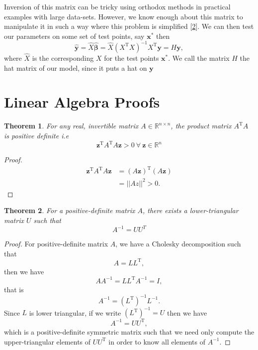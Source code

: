 \documentclass[10pt,a4paper, twocolumn, conference]{IEEEtran}
\theoremstyle{own}
\theoremstyle{definition}
\theoremstyle{plain}
\newtheorem{thm}{Theorem}
\begin{document}
Inversion of this matrix can be tricky using orthodox methods in practical examples with large data-sets. However, we know enough about this matrix to manipulate it in such a way where this problem is simplified [\ref{ap:2}]. We can then test our parameters on some set of test points, say $\mathbf{x}^{*}$ then
\begin{equation}
\hat{\mathbf{y}} = \hat{X} \hat{\boldsymbol\beta} = \hat{X} (X^{\text{T}} X)^{-1} X^{\text{T}}\mathbf{y} = H\textbf{y},
\end{equation}
where $\hat{X}$ is the corresponding $X$ for the test points $\mathbf{x}^{*}$. We call the matrix $H$ the hat matrix of our model, since it puts a hat on $\mathbf{y}$


\appendix
\section{Linear Algebra Proofs}
\begin{thm} \label{posdef}
For any real, invertible matrix $A \in \mathbb{R}^{n \times n}$, the product matrix $A^{\text{T}}A$ is positive definite i.e
\begin{equation}
\mathbf{z}^{\text{T}} A^{\text{T}}A \mathbf{z} > 0 ~ \forall ~ \mathbf{z} \in \mathbb{R}^{n}
\end{equation}
\end{thm}
\begin{proof}
\begin{align} \nonumber
\mathbf{z}^{\text{T}} A^{\text{T}}A \mathbf{z} & = (A \mathbf{z})^{\text{T}} (A \mathbf{z}) \\
& = || Az ||^2 > 0.
\end{align}
\end{proof}
\begin{thm} \label{ap:2}
For a positive-definite matrix $A$, there exists a lower-triangular matrix $U$ such that
\begin{equation}
A^{-1} = U U^{T}
\end{equation}
\end{thm}
\begin{proof}
For positive-definite matrix $A$, we have a Cholesky decomposition such that
\begin{equation}
A = L L^{\text{T}},
\end{equation}
then we have
\begin{equation}
A A^{-1} = L L^{\text{T}} A^{-1} = I,
\end{equation}
that is
\begin{equation}
A^{-1} = ( L^{\text{T}} )^{-1} L^{-1}.
\end{equation}
Since $L$ is lower triangular, if we write $( L^{\text{T}} )^{-1} = U$ then we have
\begin{equation}
A^{-1} = U U^{\text{T}},
\end{equation}
which is a positive-definite symmetric matrix such that we need only compute the upper-triangular elements of $U U^{\text{T}}$ in order to know all elements of $A^{-1}$.
\end{proof}













 
\end{document}
